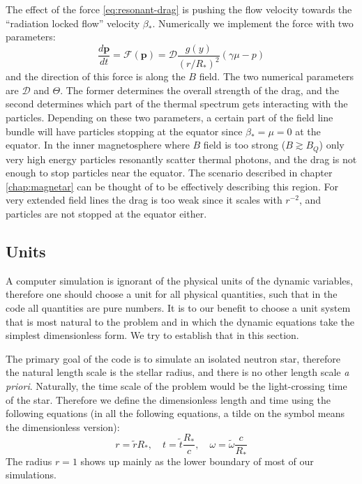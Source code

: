 The effect of the force \eqref{eq:resonant-drag} is pushing the flow velocity
towards the ``radiation locked flow'' velocity $\beta_{*}$. Numerically we
implement the force with two parameters:
\begin{equation}
  \label{eq:resonant-drag-numerical}
  \frac{d\mathbf{p}}{dt} = \mathcal{F}(\mathbf{p}) = \mathcal{D}\frac{g(y)}{(r/R_{*})^2}(\gamma\mu - p)
\end{equation}
and the direction of this force is along the $B$ field. The two numerical
parameters are $\mathcal{D}$ and $\Theta$. The former determines the overall
strength of the drag, and the second determines which part of the thermal
spectrum gets interacting with the particles. Depending on these two parameters,
a certain part of the field line bundle will have particles stopping at the
equator since $\beta_{*} = \mu = 0$ at the equator. In the inner magnetosphere
where $B$ field is too strong ($B \gtrsim B_{Q}$) only very high energy
particles resonantly scatter thermal photons, and the drag is not enough to stop
particles near the equator. The scenario described in chapter
\ref{chap:magnetar} can be thought of to be effectively describing this region.
For very extended field lines the drag is too weak since it scales with
$r^{-2}$, and particles are not stopped at the equator either.



\subsection{Units}
\label{sec:pic-units}

A computer simulation is ignorant of the physical units of the dynamic
variables, therefore one should choose a unit for all physical quantities, such
that in the code all quantities are pure numbers. It is to our benefit to choose
a unit system that is most natural to the problem and in which the dynamic
equations take the simplest dimensionless form. We try to establish that in this
section.

The primary goal of the code is to simulate an isolated neutron star, therefore
the natural length scale is the stellar radius, and there is no other length
scale {\it a priori}. Naturally, the time scale of the problem would be the
light-crossing time of the star. Therefore we define the dimensionless length
and time using the following equations (in all the following equations, a tilde
on the symbol means the dimensionless version):
\begin{equation}
  r = \tilde{r}R_{*},\quad t = \tilde{t}\frac{R_{*}}{c},\quad \omega = \tilde{\omega}\frac{c}{R_{*}}
\end{equation}
The radius $r = 1$ shows up mainly as the lower boundary of most of our
simulations.

